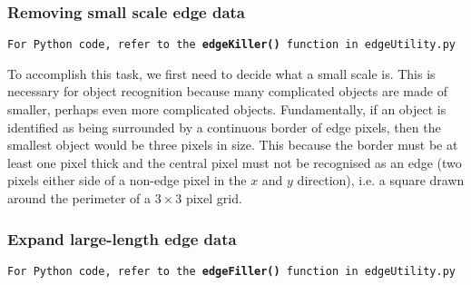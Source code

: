 \documentclass[11pt]{article}
\begin{document}
\subsubsection{Removing small scale edge data}
\begin{center}
\texttt{For Python code, refer to the {\bf edgeKiller()} function in edgeUtility.py}
\end{center}
To accomplish this task, we first need to decide what a small scale is. This is necessary for object recognition because many complicated objects are made of smaller, perhaps even more complicated objects. Fundamentally, if an object is identified as being surrounded by a continuous border of edge pixels, then the smallest object would be three pixels in size. This because the border must be at least one pixel thick and the central pixel must not be recognised as an edge (two pixels either side of a non-edge pixel in the $x$ and $y$ direction), i.e. a square drawn around the perimeter of a $3 \times 3$ pixel grid.



\subsubsection{Expand large-length edge data}
\begin{center}
\texttt{For Python code, refer to the {\bf edgeFiller()} function in edgeUtility.py}
\end{center}
\end{document}
